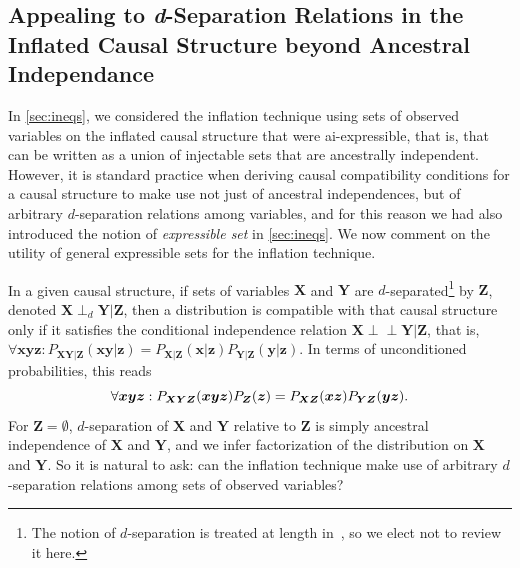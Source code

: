 \documentclass[aps,english,10pt,superscriptaddress,onecolumn,twoside,longbibliography,pra,floatfix,fleqn,nofootinbib]{revtex4-1}
\theoremstyle{definition}
\newcommand{\p}[2][]{{P_{#1}}\parenths{#2}}
\newcommand{\indep}{\perp\!\!\!\!\perp}
\DeclarePairedDelimiter{\parenths}{\lparen}{\rparen}
\begin{document}
\subsection{Appealing to \textit{d}-Separation Relations in the Inflated Causal Structure beyond Ancestral Independance}\label{sec:fulldsep}

In \cref{sec:ineqs}, we considered the inflation technique using sets of observed variables on the inflated causal structure that were 
ai-expressible, that is, that can be written as a union of injectable sets that are ancestrally independent.
However, it is standard practice when deriving causal compatibility conditions for a causal structure to make use not just of ancestral independences, but of arbitrary $d$-separation relations among variables, and for this reason we had also introduced the notion of \emph{expressible set} in \cref{sec:ineqs}. We now comment on the utility of general expressible sets for the inflation technique.

In a given causal structure, if sets of variables $\bm{X}$ and $\bm{Y}$ are $d$-separated\footnote{The notion of $d$-separation is treated at length in~\cite{pearl2009causality,studeny2005probabilistic,WoodSpekkens,pusey2014gdag}, so we elect not to review it here.} by $\bm{Z}$, denoted  $\bm{X}\perp_d \bm{Y}|\bm{Z}$, then a distribution is compatible with that causal structure only if it satisfies the conditional independence relation $\bm{X}\indep\bm{Y}|\bm{Z}$, that is,
 $\forall{\bm{x} \bm{y} \bm{z}}: P_{\bm{X}\bm{Y}|\bm{Z}}(\bm{x}\bm{y}|\bm{z})=P_{\bm{X}|\bm{Z}}(\bm{x}|\bm{z})P_{\bm{Y}|\bm{Z}}(\bm{y}|\bm{z})$. In terms of unconditioned probabilities, this reads
\begin{equation}\label{CIuncondprobs}
\forall{\bm{x} \bm{y} \bm{z}}: \p[\bm{X}\bm{Y}\bm{Z}]{\bm{x}\bm{y}\bm{z}}\p[\bm{Z}]{\bm{z}}=\p[\bm{X}\bm{Z}]{\bm{x}\bm{z}}\p[\bm{Y}\bm{Z}]{\bm{y}\bm{z}}.
\end{equation}
For $\bm{Z} = \emptyset$, $d$-separation of $\bm{X}$ and $\bm{Y}$ relative to $\bm{Z}$ is simply ancestral independence of $\bm{X}$ and $\bm{Y}$, and we infer factorization of the distribution on $\bm{X}$ and $\bm{Y}$. So it is natural to ask: can the inflation technique make use of arbitrary $d$-separation relations among sets of observed variables? 
\end{document}
